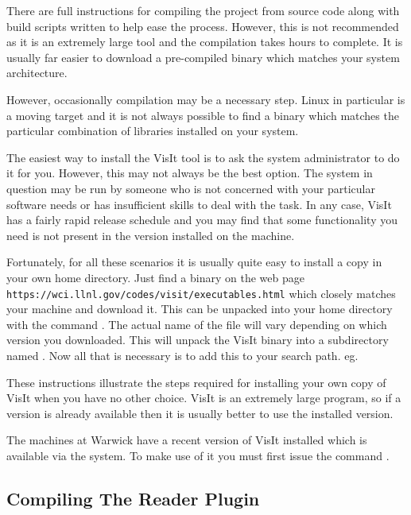  There are full instructions for compiling the project from source code
  along with build scripts written to help ease the process. However, this
  is not recommended as it is an extremely large tool and the compilation
  takes hours to complete. It is usually far easier to download a pre-compiled
  binary which matches your system architecture.

  However, occasionally compilation may be a necessary step. Linux
  in particular is a moving target and it is not always possible to
  find a binary which matches the particular combination of libraries
  installed on your system.

  The easiest way to install the VisIt tool is to ask the system
  administrator to do it for you. However, this may not always be the
  best option. The system in question may be run by someone who is
  not concerned with your particular software needs or has insufficient
  skills to deal with the task. In any case, VisIt has a fairly rapid
  release schedule and you may find that some functionality you need
  is not present in the version installed on the machine.

  Fortunately, for all these scenarios it is usually quite easy to install
  a copy in your own home directory. Just find a binary on the web page
  {\tt https://wci.llnl.gov/codes/visit/executables.html} which closely
  matches your machine and download it. This can be unpacked into your
  home directory with the command
  . The actual name of
  the file will vary depending on which version you downloaded. This
  will unpack the VisIt binary into a subdirectory named .
  Now all that is necessary is to add this to your search path.
  eg. 

  These instructions illustrate the steps required for installing your
  own copy of VisIt when you have no other choice. VisIt is an extremely
  large program, so if a version is already available then it is usually
  better to use the installed version.

  The machines at Warwick have a recent version of VisIt installed which
  is available via the  system. To make use of it you must
  first issue the command .

\subsection{Compiling The Reader Plugin}

